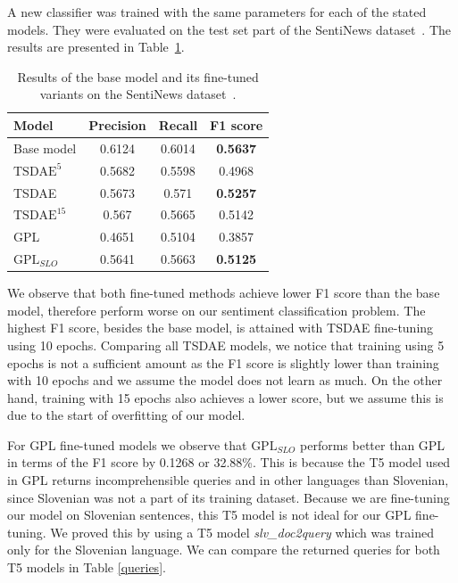 \documentclass[fleqn,moreauthors,10pt]{ds_report}
\begin{document}
A new classifier was trained with the same parameters for each of the stated models. They were evaluated on the test set part of the SentiNews dataset~\cite{sentiNews}. The results are presented in Table~\ref{tab2}.

\begin{table}[!h]
	\footnotesize
	\begin{center}
		\begin{tabular}{ |l|c|c|c| }
		\hline
		\rowcolor{Blue}Model & Precision & Recall & F1 score\\
		\hline

		Base model & 0.6124 & 0.6014 & \textbf{0.5637}\\
		\hline
		$\text{TSDAE}^{5}$ & 0.5682 & 0.5598 & 0.4968\\
		TSDAE &  0.5673 & 0.571 & \textbf{0.5257}\\
		$\text{TSDAE}^{15}$ & 0.567 & 0.5665 & 0.5142\\
		\hline
		GPL & 0.4651 & 0.5104 & 0.3857\\
		$\text{GPL}_{SLO}$ & 0.5641 & 0.5663 & \textbf{0.5125}\\

		\hline
		\end{tabular}
	\end{center}
\caption{Results of the base model and its fine-tuned variants on the SentiNews dataset~\cite{sentiNews}.}
\label{tab2}
\end{table}

We observe that both fine-tuned methods achieve lower F1 score than the base model, therefore perform worse on our sentiment classification problem. The highest F1 score, besides the base model, is attained with TSDAE fine-tuning using 10 epochs. Comparing all TSDAE models, we notice that training using 5 epochs is not a sufficient amount as the F1 score is slightly lower than training with 10 epochs and we assume the model does not learn as much. On the other hand, training with 15 epochs also achieves a lower score, but we assume this is due to the start of overfitting of our model.

For GPL fine-tuned models we observe that $\text{GPL}_{SLO}$ performs better than GPL in terms of the F1 score by 0.1268 or 32.88\%. This is because the T5 model used in GPL returns incomprehensible queries and in other languages than Slovenian,
since Slovenian was not a part of its training dataset. Because we are fine-tuning our model on Slovenian sentences, this T5 model is not ideal for our GPL fine-tuning. We proved this by using a T5 model {\it slv\_doc2query} which was trained only for the Slovenian language. We can compare the returned queries for both T5 models in Table \ref*{queries}.
\end{document}
